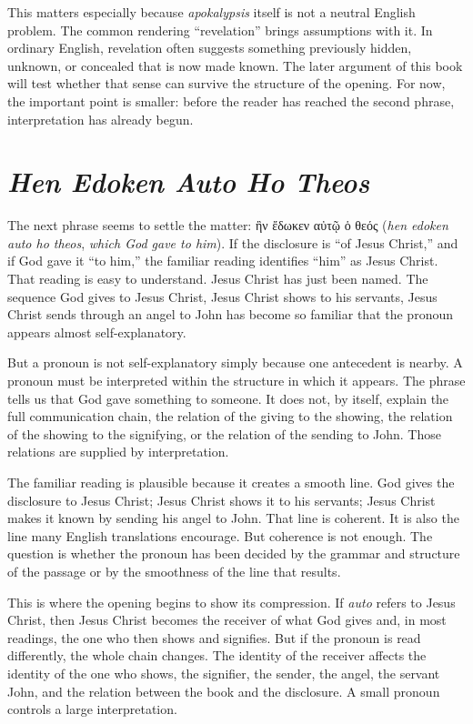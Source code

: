 This matters especially because \textit{apokalypsis} itself is not a neutral English problem. The common rendering ``revelation'' brings assumptions with it. In ordinary English, revelation often suggests something previously hidden, unknown, or concealed that is now made known. The later argument of this book will test whether that sense can survive the structure of the opening. For now, the important point is smaller: before the reader has reached the second phrase, interpretation has already begun.

\section{\textit{Hen Edoken Auto Ho Theos}}

The next phrase seems to settle the matter: \textgreek{ἣν ἔδωκεν αὐτῷ ὁ θεός} (\textit{hen edoken auto ho theos}, \textit{which God gave to him}). If the disclosure is ``of Jesus Christ,'' and if God gave it ``to him,'' the familiar reading identifies ``him'' as Jesus Christ. That reading is easy to understand. Jesus Christ has just been named. The sequence God gives to Jesus Christ, Jesus Christ shows to his servants, Jesus Christ sends through an angel to John has become so familiar that the pronoun appears almost self-explanatory.

But a pronoun is not self-explanatory simply because one antecedent is nearby. A pronoun must be interpreted within the structure in which it appears. The phrase tells us that God gave something to someone. It does not, by itself, explain the full communication chain, the relation of the giving to the showing, the relation of the showing to the signifying, or the relation of the sending to John. Those relations are supplied by interpretation.

The familiar reading is plausible because it creates a smooth line. God gives the disclosure to Jesus Christ; Jesus Christ shows it to his servants; Jesus Christ makes it known by sending his angel to John. That line is coherent. It is also the line many English translations encourage. But coherence is not enough. The question is whether the pronoun has been decided by the grammar and structure of the passage or by the smoothness of the line that results.

This is where the opening begins to show its compression. If \textit{auto} refers to Jesus Christ, then Jesus Christ becomes the receiver of what God gives and, in most readings, the one who then shows and signifies. But if the pronoun is read differently, the whole chain changes. The identity of the receiver affects the identity of the one who shows, the signifier, the sender, the angel, the servant John, and the relation between the book and the disclosure. A small pronoun controls a large interpretation.

